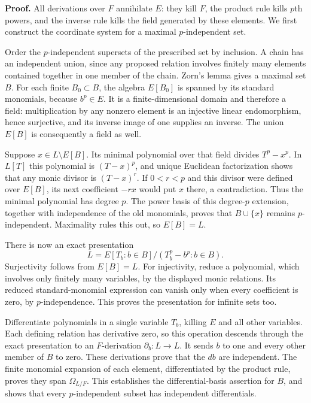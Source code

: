\documentclass[11pt,a4paper,openany]{report}
\begin{document}
\textbf{Proof.} All derivations over \(F\) annihilate \(E\): they kill \(F\), the product rule kills \(p\)th powers, and the inverse rule kills the field generated by these elements. We first construct the coordinate system for a maximal \(p\)-independent set.

Order the \(p\)-independent supersets of the prescribed set by inclusion. A chain has an independent union, since any proposed relation involves finitely many elements contained together in one member of the chain. Zorn's lemma gives a maximal set \(B\). For each finite \(B_0\subset B\), the algebra \(E[B_0]\) is spanned by its standard monomials, because \(b^p\in E\). It is a finite-dimensional domain and therefore a field: multiplication by any nonzero element is an injective linear endomorphism, hence surjective, and its inverse image of one supplies an inverse. The union \(E[B]\) is consequently a field as well.

Suppose \(x\in L\setminus E[B]\). Its minimal polynomial over that field divides \(T^p-x^p\). In \(L[T]\) this polynomial is \((T-x)^p\), and unique Euclidean factorization shows that any monic divisor is \((T-x)^r\). If \(0<r<p\) and this divisor were defined over \(E[B]\), its next coefficient \(-rx\) would put \(x\) there, a contradiction. Thus the minimal polynomial has degree \(p\). The power basis of this degree-\(p\) extension, together with independence of the old monomials, proves that \(B\cup\{x\}\) remains \(p\)-independent. Maximality rules this out, so \(E[B]=L\).

There is now an exact presentation \[
L=E[T_b:b\in B]/(T_b^p-b^p:b\in B).
\] Surjectivity follows from \(E[B]=L\). For injectivity, reduce a polynomial, which involves only finitely many variables, by the displayed monic relations. Its reduced standard-monomial expression can vanish only when every coefficient is zero, by \(p\)-independence. This proves the presentation for infinite sets too.

Differentiate polynomials in a single variable \(T_b\), killing \(E\) and all other variables. Each defining relation has derivative zero, so this operation descends through the exact presentation to an \(F\)-derivation \(\partial_b:L\to L\). It sends \(b\) to one and every other member of \(B\) to zero. These derivations prove that the \(db\) are independent. The finite monomial expansion of each element, differentiated by the product rule, proves they span \(\Omega_{L/F}\). This establishes the differential-basis assertion for \(B\), and shows that every \(p\)-independent subset has independent differentials.
\end{document}
